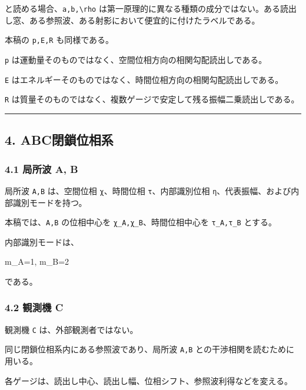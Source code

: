 \documentclass[
  a4paper,
]{article}
\newenvironment{Shaded}{}{}
\newcommand{\NormalTok}[1]{#1}
\begin{document}
と読める場合、\texttt{a,b,\textbackslash{}rho}
は第一原理的に異なる種類の成分ではない。ある読出し窓、ある参照波、ある射影において便宜的に付けたラベルである。

本稿の \texttt{p,E,R} も同様である。

\texttt{p}
は運動量そのものではなく、空間位相方向の相関勾配読出しである。

\texttt{E}
はエネルギーそのものではなく、時間位相方向の相関勾配読出しである。

\texttt{R}
は質量そのものではなく、複数ゲージで安定して残る振幅二乗読出しである。

\begin{center}\rule{0.5\linewidth}{0.5pt}\end{center}

\subsection{4. ABC閉鎖位相系}\label{abcux9589ux9396ux4f4dux76f8ux7cfb}

\subsubsection{4.1 局所波 A, B}\label{ux5c40ux6240ux6ce2-a-b}

局所波 \texttt{A,B} は、空間位相 \texttt{χ}、時間位相
\texttt{τ}、内部識別位相
\texttt{η}、代表振幅、および内部識別モードを持つ。

本稿では、\texttt{A,B} の位相中心を \texttt{χ\_A,χ\_B}、時間位相中心を
\texttt{τ\_A,τ\_B} とする。

内部識別モードは、

\begin{Shaded}
\begin{Highlighting}[]
\NormalTok{m\_A=1,}
\NormalTok{m\_B=2}
\end{Highlighting}
\end{Shaded}

である。

\subsubsection{4.2 観測機 C}\label{ux89b3ux6e2cux6a5f-c}

観測機 \texttt{C} は、外部観測者ではない。

同じ閉鎖位相系内にある参照波であり、局所波 \texttt{A,B}
との干渉相関を読むために用いる。

各ゲージは、読出し中心、読出し幅、位相シフト、参照波利得などを変える。
\end{document}
